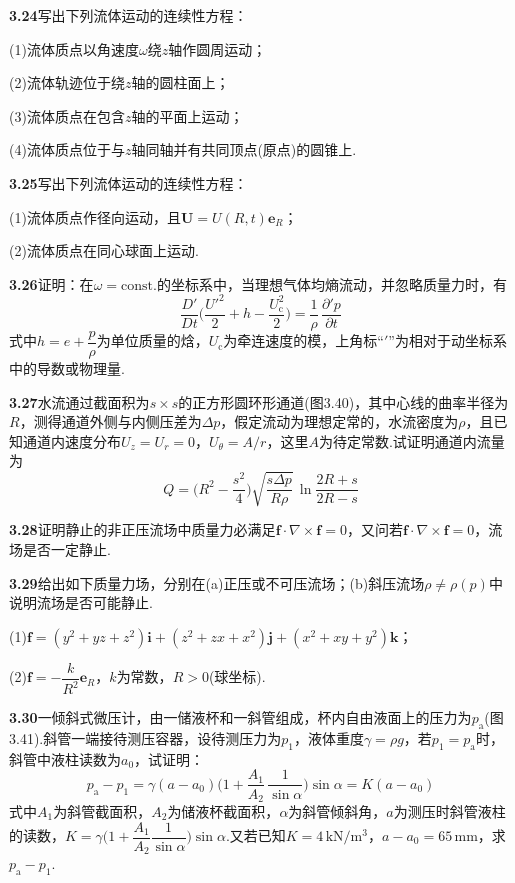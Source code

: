 \medskip
\noindent\textbf{3.24}\quad 写出下列流体运动的连续性方程：

(1)流体质点以角速度$\omega$绕$z$轴作圆周运动；

(2)流体轨迹位于绕$z$轴的圆柱面上；

(3)流体质点在包含$z$轴的平面上运动；

(4)流体质点位于与$z$轴同轴并有共同顶点(原点)的圆锥上.

\medskip
\noindent\textbf{3.25}\quad 写出下列流体运动的连续性方程：

(1)流体质点作径向运动，且$\boldsymbol{U}=U(R,t)\boldsymbol{e}_R$；

(2)流体质点在同心球面上运动.

\medskip
\noindent\textbf{3.26}\quad 证明：在$\omega=\mathrm{const.}$的坐标系中，当理想气体均熵流动，并忽略质量力时，有
\[
\frac{D'}{Dt}\bigg(\frac{U'^{2}}{2}+h-\frac{U_{\mathrm{c}}^{2}}{2}\bigg)=\frac{1}{\rho}\,\frac{\partial' p}{\partial t}
\]
式中$h=e+\dfrac{p}{\rho}$为单位质量的焓，$U_{\mathrm{c}}$为牵连速度的模，上角标“$'$”为相对于动坐标系中的导数或物理量.

\medskip
\noindent\textbf{3.27}\quad 水流通过截面积为$s\times s$的正方形圆环形通道(图3.40)，其中心线的曲率半径为$R$，测得通道外侧与内侧压差为$\Delta p$，假定流动为理想定常的，水流密度为$\rho$，且已知通道内速度分布$U_z=U_r=0$，$U_\theta=A/r$，这里$A$为待定常数.试证明通道内流量为
\[
Q=\Big(R^{2}-\frac{s^{2}}{4}\Big)\sqrt{\frac{s\Delta p}{R\rho}}\,\ln\frac{2R+s}{2R-s}
\]

\medskip
\noindent\textbf{3.28}\quad 证明静止的非正压流场中质量力必满足$\boldsymbol{f}\cdot\nabla\times\boldsymbol{f}=0$，又问若$\boldsymbol{f}\cdot\nabla\times\boldsymbol{f}=0$，流场是否一定静止.

\medskip
\noindent\textbf{3.29}\quad 给出如下质量力场，分别在(a)正压或不可压流场；(b)斜压流场$\rho\neq\rho(p)$中说明流场是否可能静止.

(1)$\boldsymbol{f}=(y^{2}+yz+z^{2})\boldsymbol{i}+(z^{2}+zx+x^{2})\boldsymbol{j}+(x^{2}+xy+y^{2})\boldsymbol{k}$；

(2)$\boldsymbol{f}=-\dfrac{k}{R^{2}}\boldsymbol{e}_R$，$k$为常数，$R>0$(球坐标).

\medskip
\noindent\textbf{3.30}\quad 一倾斜式微压计，由一储液杯和一斜管组成，杯内自由液面上的压力为$p_{\mathrm{a}}$(图3.41).斜管一端接待测压容器，设待测压力为$p_1$，液体重度$\gamma=\rho g$，若$p_1=p_{\mathrm{a}}$时，斜管中液柱读数为$a_0$，试证明：
\[
p_{\mathrm{a}}-p_1=\gamma(a-a_0)\bigg(1+\frac{A_1}{A_2}\,\frac{1}{\sin\alpha}\bigg)\sin\alpha=K(a-a_0)
\]
式中$A_1$为斜管截面积，$A_2$为储液杯截面积，$\alpha$为斜管倾斜角，$a$为测压时斜管液柱的读数，$K=\gamma\Big(1+\dfrac{A_1}{A_2}\dfrac{1}{\sin\alpha}\Big)\sin\alpha$.又若已知$K=4\,\mathrm{kN/m^3}$，$a-a_0=65\,$mm，求$p_{\mathrm{a}}-p_1$.

